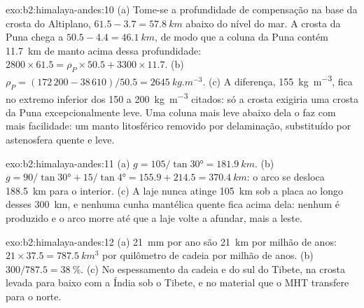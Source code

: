 \begin{solution}{exo:b2:himalaya-andes:10}
(a) Tome-se a profundidade de compensação na base da crosta do Altiplano, $61.5 - 3.7 =
\qty{57.8}{km}$ abaixo do nível do mar. A crosta da Puna chega a $50.5 - 4.4 = \qty{46.1}{km}$, de modo que a
coluna da Puna contém \qty{11.7}{km} de manto acima dessa profundidade: $2800\times61.5 =
\rho_P\times50.5 + 3300\times11.7$. (b) $\rho_P = (172\,200 - 38\,610)/50.5 =
\qty{2645}{kg.m^{-3}}$. (c) A diferença, \qty{155}{kg.m^{-3}}, fica no extremo inferior dos
150 a \qty{200}{kg.m^{-3}} citados: só a crosta exigiria uma crosta da Puna excepcionalmente leve.
Uma coluna mais leve abaixo dela o faz com mais facilidade: um manto litosférico removido por delaminação,
substituído por astenosfera quente e leve.
\end{solution}

\begin{solution}{exo:b2:himalaya-andes:11}
(a) $g = 105/\tan\ang{30} = \qty{181.9}{km}$. (b) $g = 90/\tan\ang{30} + 15/\tan\ang{4} =
155.9 + 214.5 = \qty{370.4}{km}$: o arco se desloca \qty{188.5}{km} para o interior. (c) A laje nunca
atinge \qty{105}{km} sob a placa ao longo desses \qty{300}{km}, e nenhuma cunha mantélica quente fica
acima dela: nenhum  é produzido e o arco morre até que a laje volte a afundar, mais a leste.
\end{solution}

\begin{solution}{exo:b2:himalaya-andes:12}
(a) \qty{21}{mm} por ano são \qty{21}{km} por milhão de anos: $21\times37.5 =
\qty{787.5}{km^3}$ por quilômetro de cadeia por milhão de anos. (b) $300/787.5 =
\qty{38}{\percent}$. (c) No espessamento da cadeia e do sul do Tibete, na crosta
levada para baixo com a Índia sob o Tibete, e no material que o MHT transfere para o norte.
\end{solution}

